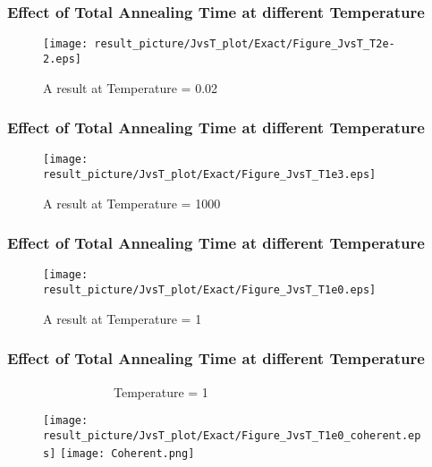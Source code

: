 \documentclass{beamer}
\begin{document}
\begin{frame}
	\frametitle{Effect of Total Annealing Time at different Temperature}
	
	\begin{figure}
		\centering
		\texttt{[image: result\_picture/JvsT\_plot/Exact/Figure\_JvsT\_T2e-2.eps]}
		\caption{A result at Temperature = 0.02}
	\end{figure}
\end{frame}


\begin{frame}
	\frametitle{Effect of Total Annealing Time at different Temperature}
	
	\begin{figure}
		\centering
		\texttt{[image: result\_picture/JvsT\_plot/Exact/Figure\_JvsT\_T1e3.eps]}
		\caption{A result at Temperature = 1000}
	\end{figure}
\end{frame}

\begin{frame}
	\frametitle{Effect of Total Annealing Time at different Temperature}
	
	\begin{figure}
		\centering
		\texttt{[image: result\_picture/JvsT\_plot/Exact/Figure\_JvsT\_T1e0.eps]}
		\caption{A result at Temperature = 1}
	\end{figure}
\end{frame}
\renewcommand*{\thefootnote}{\fnsymbol{footnote}}
\begin{frame}
	\frametitle{Effect of Total Annealing Time at different Temperature}
	~~~~~~~~~~~~~~~~~Temperature = 1\\
	\begin{figure}
		\centering
		\texttt{[image: result\_picture/JvsT\_plot/Exact/Figure\_JvsT\_T1e0\_coherent.eps]}
		\hfill
		\texttt{[image: Coherent.png]}\footnotemark[1]
	\end{figure}
	
\end{frame}
\end{document}
